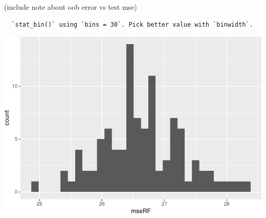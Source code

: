 \documentclass[12pt,twoside]{reedthesis}
\begin{document}
  (include note about oob error vs test mse)
  
  \begin{Shaded}
  \begin{Highlighting}[]
  \StringTok{ }\NormalTok{(}\NormalTok{,}\NormalTok{)}
  \StringTok{ }\NormalTok{(}\NormalTok{,}\NormalTok{)}
  \NormalTok{:}\NormalTok{)\{}
    \StringTok{ }   \NormalTok{)}
    \StringTok{ }\StringTok{ }\NormalTok{)}
  \NormalTok{\}}
  
  \StringTok{ }
  
  \NormalTok{(}\NormalTok{(}  \StringTok{ }\NormalTok{()}
  \end{Highlighting}
  \end{Shaded}
  
  \begin{verbatim}
  `stat_bin()` using `bins = 30`. Pick better value with `binwidth`.
  \end{verbatim}
  
  \begin{center}\includegraphics{Thesis_files/figure-latex/unnamed-chunk-13-1} \end{center}
  
\end{document}
